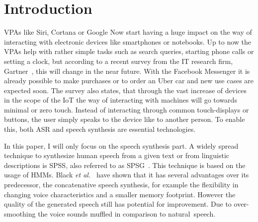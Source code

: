 

\section{Introduction}
\label{sec:introduction}

\acp{VPA} like Siri, Cortana or Google Now start having a huge impact on the way of interacting with electronic devices like smartphones or notebooks. Up to now the \acp{VPA} help with rather simple tasks such as search queries, starting phone calls or setting a clock, but according to a recent survey from the IT research firm, Gartner~\cite{gartner:assistants}, this will change in the near future. With the Facebook Messenger it is already possible to make purchases or to order an Uber car and new use cases are expected soon. The survey also states, that through the vast increase of devices in the scope of the \ac{IoT} the way of interacting with machines will go towards minimal or zero touch. Instead of interacting through common touch-displays or buttons, the user simply speaks to the device like to another person. To enable this, both \ac{ASR} and speech synthesis are essential technologies.

In this paper, I will only focus on the speech synthesis part. A widely spread technique to synthesize human speech from a given text or from linguistic descriptions is \acf{SPSS}, also referred to as \ac{SPSG}~\cite{ling:deep}. This technique is based on the usage of \acp{HMM}. Black \textit{et al.}~\cite{black:statistical} have shown that it has several advantages over its predecessor, the concatenative speech synthesis, for example the flexibility in changing voice characteristics and a smaller memory footprint. However the quality of the generated speech still has potential for improvement. Due to over-smoothing the voice sounds muffled in comparison to natural~speech.

